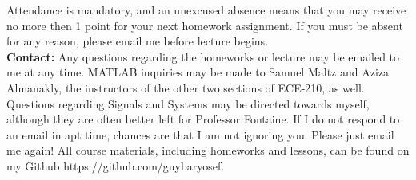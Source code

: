 \documentclass[12pt]{article}
\begin{document}
Attendance is mandatory, and an unexcused absence means that you may
receive no more then 1 point for your next homework assignment. 
If you must be absent for any reason, please email me before lecture begins. \\

\textbf{Contact:}
Any questions regarding the homeworks or lecture may be emailed 
to me at any time.
MATLAB inquiries may be made to Samuel Maltz and Aziza Almanakly, 
the instructors of the other two sections of ECE-210, as well. 
Questions regarding Signals and Systems may be directed towards myself, 
although they are often better left for Professor Fontaine. 
If I do not respond to an email in apt time, 
chances are that I am not ignoring you. 
Please just email me again!
All course materials, including homeworks and lessons,
can be found on my Github https://github.com/guybaryosef.
\end{document}
